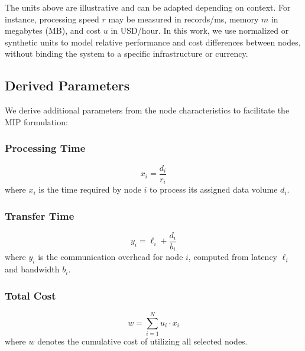 \documentclass[]{interact}
\theoremstyle{plain}
\theoremstyle{definition}
\theoremstyle{remark}
\begin{document}
The units above are illustrative and can be adapted depending on context. For instance, processing speed $r$ may be measured in records/ms, memory $m$ in megabytes (MB), and cost $u$ in USD/hour. In this work, we use normalized or synthetic units to model relative performance and cost differences between nodes, without binding the system to a specific infrastructure or currency.

\subsection{Derived Parameters}
We derive additional parameters from the node characteristics to facilitate the MIP formulation:

\subsubsection{Processing Time}
\begin{equation}
    x_i = \frac{d_i}{r_i}
\end{equation}
where $x_i$ is the time required by node $i$ to process its assigned data volume $d_i$.

\subsubsection{Transfer Time}
\begin{equation}
    y_i = \ell_i + \frac{d_i}{b_i}
\end{equation}
where $y_i$ is the communication overhead for node $i$, computed from latency $\ell_i$ and bandwidth $b_i$.

\subsubsection{Total Cost}
\begin{equation}
    w = \sum_{i=1}^N u_i \cdot x_i
\end{equation}
where $w$ denotes the cumulative cost of utilizing all selected nodes.
\end{document}
